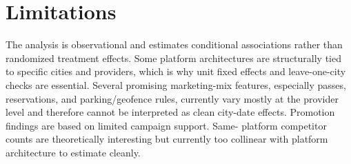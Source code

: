 \documentclass[11pt]{article}
\begin{document}
\section{Limitations}

The analysis is observational and estimates conditional associations rather than randomized
treatment effects. Some platform architectures are structurally tied to specific cities and
providers, which is why unit fixed effects and leave-one-city checks are essential. Several
promising marketing-mix features, especially passes, reservations, and parking/geofence
rules, currently vary mostly at the provider level and therefore cannot be interpreted as
clean city-date effects. Promotion findings are based on limited campaign support. Same-
platform competitor counts are theoretically interesting but currently too collinear with
platform architecture to estimate cleanly.
\end{document}
